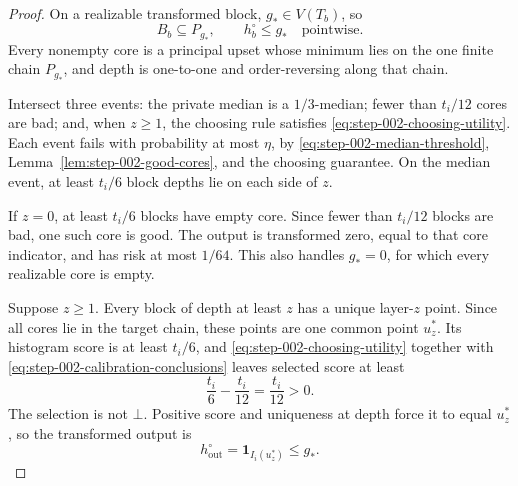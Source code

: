 \begin{proof}
On a realizable transformed block, \(g_*\in V(T_b)\), so
\begin{equation}\label{eq:step-002-core-nesting}
B_b\subseteq P_{g_*},
\qquad h_b^\circ\le g_*\quad\text{pointwise}.
\end{equation}
Every nonempty core is a principal upset whose minimum lies on the one finite
chain \(P_{g_*}\), and depth is one-to-one and order-reversing along that
chain.

Intersect three events: the private median is a \(1/3\)-median; fewer than
\(t_i/12\) cores are bad; and, when \(z\ge1\), the choosing rule satisfies
\eqref{eq:step-002-choosing-utility}.  Each event fails with probability at
most \(\eta\), by
\eqref{eq:step-002-median-threshold},
Lemma~\ref{lem:step-002-good-cores}, and the choosing guarantee.  On the
median event, at least \(t_i/6\) block depths lie on each side of \(z\).

If \(z=0\), at least \(t_i/6\) blocks have empty core.  Since fewer than
\(t_i/12\) blocks are bad, one such core is good.  The output is transformed
zero, equal to that core indicator, and has risk at most \(1/64\).  This
also handles \(g_*=0\), for which every realizable core is empty.

Suppose \(z\ge1\).  Every block of depth at least \(z\) has a unique
layer-\(z\) point.  Since all cores lie in the target chain, these points
are one common point \(u_z^*\).  Its histogram score is at least
\(t_i/6\), and \eqref{eq:step-002-choosing-utility} together with
\eqref{eq:step-002-calibration-conclusions} leaves selected score at least
\begin{equation}\label{eq:step-002-positive-score}
\frac{t_i}{6}-\frac{t_i}{12}=\frac{t_i}{12}>0.
\end{equation}
The selection is not \(\bot\).  Positive score and uniqueness at depth
force it to equal \(u_z^*\), so the transformed output is
\begin{equation}\label{eq:step-002-output-nesting}
h_{\mathrm{out}}^\circ=\mathbf1_{I_i(u_z^*)}\le g_*.
\end{equation}


\end{proof}
